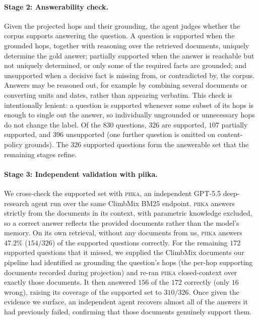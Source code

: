 \paragraph{Stage 2: Answerability check.}
Given the projected hops and their grounding, the agent judges whether the corpus supports answering the
question. A question is supported when the grounded hops, together with reasoning over the retrieved
documents, uniquely determine the gold answer; partially supported when the answer is reachable but not
uniquely determined, or only some of the required facts are grounded; and unsupported when a decisive fact is
missing from, or contradicted by, the corpus. Answers may be reasoned out, for example by combining several
documents or converting units and dates, rather than appearing verbatim. This check is intentionally lenient:
a question is supported whenever some subset of its hops is enough to single out the answer, so individually
ungrounded or unnecessary hops do not change the label. Of the $830$ questions, $326$ are supported, $107$
partially supported, and $396$ unsupported (one further question is omitted on content-policy grounds). The
$326$ supported questions form the answerable set that the remaining stages refine.

\paragraph{Stage 3: Independent validation with piika.}
We cross-check the supported set with \textsc{piika}, an independent GPT-5.5 deep-research agent run over the
same ClimbMix BM25 endpoint. \textsc{piika} answers strictly from the documents in its context, with
parametric knowledge excluded, so a correct answer reflects the provided documents rather than the model's
memory. On its own retrieval, without any documents from us, \textsc{piika} answers $47.2\%$ ($154/326$) of
the supported questions correctly. For the remaining $172$ supported questions that it missed, we supplied the
ClimbMix documents our pipeline had identified as grounding the question's hops (the per-hop supporting
documents recorded during projection) and re-ran \textsc{piika} closed-context over exactly those documents.
It then answered $156$ of the $172$ correctly (only $16$ wrong), raising its coverage of the supported set to
$310/326$. Once given the evidence we surface, an independent agent recovers almost all of the answers it had
previously failed, confirming that those documents genuinely support them.


